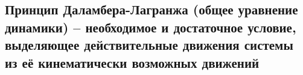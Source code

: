 

\subsection{Принцип Даламбера-Лагранжа (общее уравнение динамики) -- необходимое и достаточное условие, выделяющее действительные движения системы из её кинематически возможных движений}



